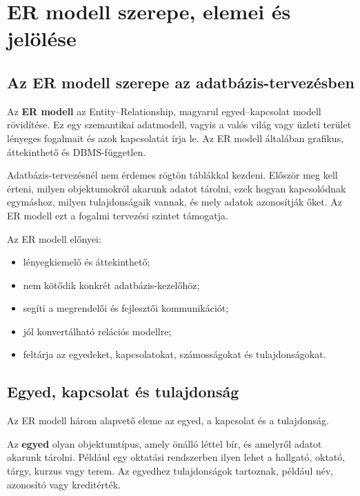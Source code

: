 \section{ER modell szerepe, elemei és jelölése}

\subsection{Az ER modell szerepe az adatbázis-tervezésben}

Az \textbf{ER modell} az Entity--Relationship, magyarul egyed--kapcsolat modell rövidítése. Ez egy szemantikai adatmodell, vagyis a valós világ vagy üzleti terület lényeges fogalmait és azok kapcsolatát írja le. Az ER modell általában grafikus, áttekinthető és DBMS-független.

Adatbázis-tervezésnél nem érdemes rögtön táblákkal kezdeni. Először meg kell érteni, milyen objektumokról akarunk adatot tárolni, ezek hogyan kapcsolódnak egymáshoz, milyen tulajdonságaik vannak, és mely adatok azonosítják őket. Az ER modell ezt a fogalmi tervezési szintet támogatja.

Az ER modell előnyei:

\begin{itemize}
  \item lényegkiemelő és áttekinthető;
  \item nem kötődik konkrét adatbázis-kezelőhöz;
  \item segíti a megrendelői és fejlesztői kommunikációt;
  \item jól konvertálható relációs modellre;
  \item feltárja az egyedeket, kapcsolatokat, számosságokat és tulajdonságokat.
\end{itemize}

\subsection{Egyed, kapcsolat és tulajdonság}

Az ER modell három alapvető eleme az egyed, a kapcsolat és a tulajdonság.

\begin{center}

\end{center}

Az \textbf{egyed} olyan objektumtípus, amely önálló léttel bír, és amelyről adatot akarunk tárolni. Például egy oktatási rendszerben ilyen lehet a hallgató, oktató, tárgy, kurzus vagy terem. Az egyedhez tulajdonságok tartoznak, például név, azonosító vagy kreditérték.

